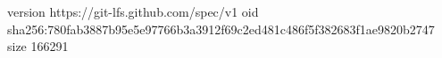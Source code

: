 version https://git-lfs.github.com/spec/v1
oid sha256:780fab3887b95e5e97766b3a3912f69c2ed481c486f5f382683f1ae9820b2747
size 166291
